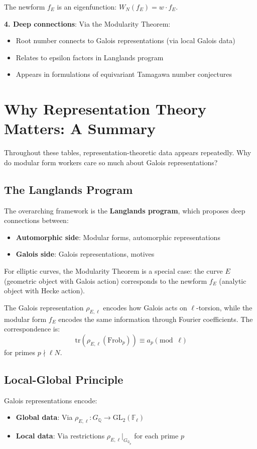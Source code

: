 \documentclass[11pt]{article}
\begin{document}
The newform $f_E$ is an eigenfunction: $W_N(f_E) = w \cdot f_E$.

\textbf{4. Deep connections}: Via the Modularity Theorem:
\begin{itemize}
\item Root number connects to Galois representations (via local Galois data)
\item Relates to epsilon factors in Langlands program
\item Appears in formulations of equivariant Tamagawa number conjectures
\end{itemize}

\section{Why Representation Theory Matters: A Summary}

Throughout these tables, representation-theoretic data appears repeatedly. Why do modular form workers care so much about Galois representations?

\subsection{The Langlands Program}

The overarching framework is the \textbf{Langlands program}, which proposes deep connections between:
\begin{itemize}
\item \textbf{Automorphic side}: Modular forms, automorphic representations
\item \textbf{Galois side}: Galois representations, motives
\end{itemize}

For elliptic curves, the Modularity Theorem is a special case: the curve $E$ (geometric object with Galois action) corresponds to the newform $f_E$ (analytic object with Hecke action).

The Galois representation $\rho_{E,\ell}$ encodes how Galois acts on $\ell$-torsion, while the modular form $f_E$ encodes the same information through Fourier coefficients. The correspondence is:
$$\text{tr}(\rho_{E,\ell}(\text{Frob}_p)) \equiv a_p \pmod{\ell}$$
for primes $p \nmid \ell N$.

\subsection{Local-Global Principle}

Galois representations encode:
\begin{itemize}
\item \textbf{Global data}: Via $\rho_{E,\ell}: G_{\mathbb{Q}} \to \text{GL}_2(\mathbb{F}_\ell)$
\item \textbf{Local data}: Via restrictions $\rho_{E,\ell}|_{G_{\mathbb{Q}_p}}$ for each prime $p$
\end{itemize}
\end{document}
